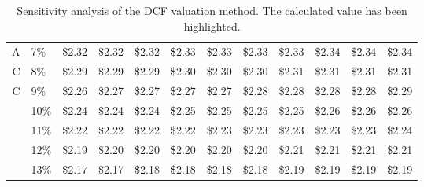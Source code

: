 \documentclass{article}
\begin{document}
\begin{table}[h]
\begin{tabular}{llllllllllll}
\multicolumn{1}{r|}{A} & \multicolumn{1}{l|}{7\%}  & \multicolumn{1}{l|}{\$2.32} & \multicolumn{1}{l|}{\$2.32} & \multicolumn{1}{l|}{\$2.32} & \multicolumn{1}{l|}{\$2.33}                         & \multicolumn{1}{l|}{\$2.33} & \multicolumn{1}{l|}{\$2.33} & \multicolumn{1}{l|}{\$2.33} & \multicolumn{1}{l|}{\$2.34} & \multicolumn{1}{l|}{\$2.34} & \multicolumn{1}{l|}{\$2.34} \\ \cline{2-12} 
\multicolumn{1}{r|}{C} & \multicolumn{1}{l|}{8\%}  & \multicolumn{1}{l|}{\$2.29} & \multicolumn{1}{l|}{\$2.29} & \multicolumn{1}{l|}{\$2.29} & \multicolumn{1}{l|}{\$2.30}                         & \multicolumn{1}{l|}{\$2.30} & \multicolumn{1}{l|}{\$2.30} & \multicolumn{1}{l|}{\$2.31} & \multicolumn{1}{l|}{\$2.31} & \multicolumn{1}{l|}{\$2.31} & \multicolumn{1}{l|}{\$2.31} \\ \cline{2-12} 
\multicolumn{1}{r|}{C} & \multicolumn{1}{l|}{9\%}  & \multicolumn{1}{l|}{\$2.26} & \multicolumn{1}{l|}{\$2.27} & \multicolumn{1}{l|}{\$2.27} & \multicolumn{1}{l|}{\$2.27}                         & \multicolumn{1}{l|}{\$2.27} & \multicolumn{1}{l|}{\$2.28} & \multicolumn{1}{l|}{\$2.28} & \multicolumn{1}{l|}{\$2.28} & \multicolumn{1}{l|}{\$2.28} & \multicolumn{1}{l|}{\$2.29} \\ \cline{2-12} 
\multicolumn{1}{l|}{}  & \multicolumn{1}{l|}{10\%} & \multicolumn{1}{l|}{\$2.24} & \multicolumn{1}{l|}{\$2.24} & \multicolumn{1}{l|}{\$2.24} & \multicolumn{1}{l|}{\$2.25}                         & \multicolumn{1}{l|}{\$2.25} & \multicolumn{1}{l|}{\$2.25} & \multicolumn{1}{l|}{\$2.25} & \multicolumn{1}{l|}{\$2.26} & \multicolumn{1}{l|}{\$2.26} & \multicolumn{1}{l|}{\$2.26} \\ \cline{2-12} 
\multicolumn{1}{l|}{}  & \multicolumn{1}{l|}{11\%} & \multicolumn{1}{l|}{\$2.22} & \multicolumn{1}{l|}{\$2.22} & \multicolumn{1}{l|}{\$2.22} & \multicolumn{1}{l|}{\$2.22}                         & \multicolumn{1}{l|}{\$2.23} & \multicolumn{1}{l|}{\$2.23} & \multicolumn{1}{l|}{\$2.23} & \multicolumn{1}{l|}{\$2.23} & \multicolumn{1}{l|}{\$2.23} & \multicolumn{1}{l|}{\$2.24} \\ \cline{2-12} 
\multicolumn{1}{l|}{}  & \multicolumn{1}{l|}{12\%} & \multicolumn{1}{l|}{\$2.19} & \multicolumn{1}{l|}{\$2.20} & \multicolumn{1}{l|}{\$2.20} & \multicolumn{1}{l|}{\$2.20}                         & \multicolumn{1}{l|}{\$2.20} & \multicolumn{1}{l|}{\$2.20} & \multicolumn{1}{l|}{\$2.21} & \multicolumn{1}{l|}{\$2.21} & \multicolumn{1}{l|}{\$2.21} & \multicolumn{1}{l|}{\$2.21} \\ \cline{2-12} 
\multicolumn{1}{l|}{}  & \multicolumn{1}{l|}{13\%} & \multicolumn{1}{l|}{\$2.17} & \multicolumn{1}{l|}{\$2.17} & \multicolumn{1}{l|}{\$2.18} & \multicolumn{1}{l|}{\$2.18}                         & \multicolumn{1}{l|}{\$2.18} & \multicolumn{1}{l|}{\$2.18} & \multicolumn{1}{l|}{\$2.19} & \multicolumn{1}{l|}{\$2.19} & \multicolumn{1}{l|}{\$2.19} & \multicolumn{1}{l|}{\$2.19} \\ \cline{2-12} 
\end{tabular}
\caption{Sensitivity analysis of the DCF valuation method. The calculated value has been highlighted.}
\label{tab:dcf_val}
\end{table}
\end{document}
